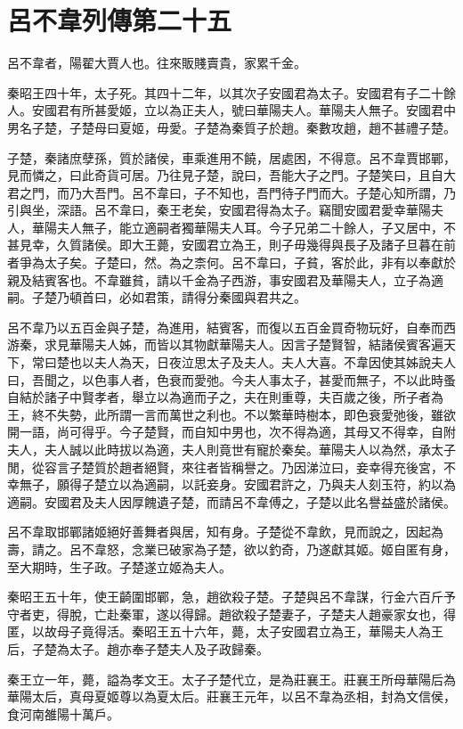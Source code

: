 \chapter{呂不韋列傳第二十五}

呂不韋者，陽翟大賈人也。往來販賤賣貴，家累千金。

秦昭王四十年，太子死。其四十二年，以其次子安國君為太子。安國君有子二十餘人。安國君有所甚愛姬，立以為正夫人，號曰華陽夫人。華陽夫人無子。安國君中男名子楚，子楚母曰夏姬，毋愛。子楚為秦質子於趙。秦數攻趙，趙不甚禮子楚。

子楚，秦諸庶孽孫，質於諸侯，車乘進用不饒，居處困，不得意。呂不韋賈邯鄲，見而憐之，曰此奇貨可居。乃往見子楚，說曰，吾能大子之門。子楚笑曰，且自大君之門，而乃大吾門。呂不韋曰，子不知也，吾門待子門而大。子楚心知所謂，乃引與坐，深語。呂不韋曰，秦王老矣，安國君得為太子。竊聞安國君愛幸華陽夫人，華陽夫人無子，能立適嗣者獨華陽夫人耳。今子兄弟二十餘人，子又居中，不甚見幸，久質諸侯。即大王薨，安國君立為王，則子毋幾得與長子及諸子旦暮在前者爭為太子矣。子楚曰，然。為之柰何。呂不韋曰，子貧，客於此，非有以奉獻於親及結賓客也。不韋雖貧，請以千金為子西游，事安國君及華陽夫人，立子為適嗣。子楚乃頓首曰，必如君策，請得分秦國與君共之。

呂不韋乃以五百金與子楚，為進用，結賓客，而復以五百金買奇物玩好，自奉而西游秦，求見華陽夫人姊，而皆以其物獻華陽夫人。因言子楚賢智，結諸侯賓客遍天下，常曰楚也以夫人為天，日夜泣思太子及夫人。夫人大喜。不韋因使其姊說夫人曰，吾聞之，以色事人者，色衰而愛弛。今夫人事太子，甚愛而無子，不以此時蚤自結於諸子中賢孝者，舉立以為適而子之，夫在則重尊，夫百歲之後，所子者為王，終不失勢，此所謂一言而萬世之利也。不以繁華時樹本，即色衰愛弛後，雖欲開一語，尚可得乎。今子楚賢，而自知中男也，次不得為適，其母又不得幸，自附夫人，夫人誠以此時拔以為適，夫人則竟世有寵於秦矣。華陽夫人以為然，承太子閒，從容言子楚質於趙者絕賢，來往者皆稱譽之。乃因涕泣曰，妾幸得充後宮，不幸無子，願得子楚立以為適嗣，以託妾身。安國君許之，乃與夫人刻玉符，約以為適嗣。安國君及夫人因厚餽遺子楚，而請呂不韋傅之，子楚以此名譽益盛於諸侯。

呂不韋取邯鄲諸姬絕好善舞者與居，知有身。子楚從不韋飲，見而說之，因起為壽，請之。呂不韋怒，念業已破家為子楚，欲以釣奇，乃遂獻其姬。姬自匿有身，至大期時，生子政。子楚遂立姬為夫人。

秦昭王五十年，使王齮圍邯鄲，急，趙欲殺子楚。子楚與呂不韋謀，行金六百斤予守者吏，得脫，亡赴秦軍，遂以得歸。趙欲殺子楚妻子，子楚夫人趙豪家女也，得匿，以故母子竟得活。秦昭王五十六年，薨，太子安國君立為王，華陽夫人為王后，子楚為太子。趙亦奉子楚夫人及子政歸秦。

秦王立一年，薨，謚為孝文王。太子子楚代立，是為莊襄王。莊襄王所母華陽后為華陽太后，真母夏姬尊以為夏太后。莊襄王元年，以呂不韋為丞相，封為文信侯，食河南雒陽十萬戶。

